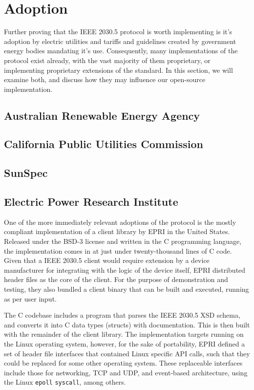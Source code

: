 \chapter{Adoption}\label{ch:adoption}

Further proving that the IEEE 2030.5 protocol is worth implementing is it's adoption by electric utilities and tariffs and guidelines created by government energy bodies mandating it's use.
Consequently, many implementations of the protocol exist already, with the vast majority of them proprietary, or implementing proprietary extensions of the standard.
In this section, we will examine both, and discuss how they may influence our open-source implementation. 

\section{Australian Renewable Energy Agency}


\section{California Public Utilities Commission}


\section{SunSpec}


\section{Electric Power Research Institute}
One of the more immediately relevant adoptions of the protocol is the mostly compliant implementation of a client library by EPRI in the United States.
Released under the BSD-3 license and written in the C programming language, the implementation comes in at just under twenty-thousand lines of C code.
Given that a IEEE 2030.5 client would require extension by a device manufacturer for integrating with the logic of the device itself, EPRI distributed header files as the core of the client.
For the purpose of demonstration and testing, they also bundled a client binary that can be built and executed, running as per user input.

The C codebase includes a program that parses the IEEE 2030.5 XSD schema, and converts it into C data types (structs) with documentation. This is then built with the remainder of the client library.
The implementation targets running on the Linux operating system, however, for the sake of portability, EPRI defined a set of header file interfaces that contained Linux specific API calls, such that they could be replaced for some other operating system.
These replaceable interfaces include those for networking, TCP and UDP, and event-based architecture, using the Linux \texttt{epoll} \texttt{syscall}, among others.

